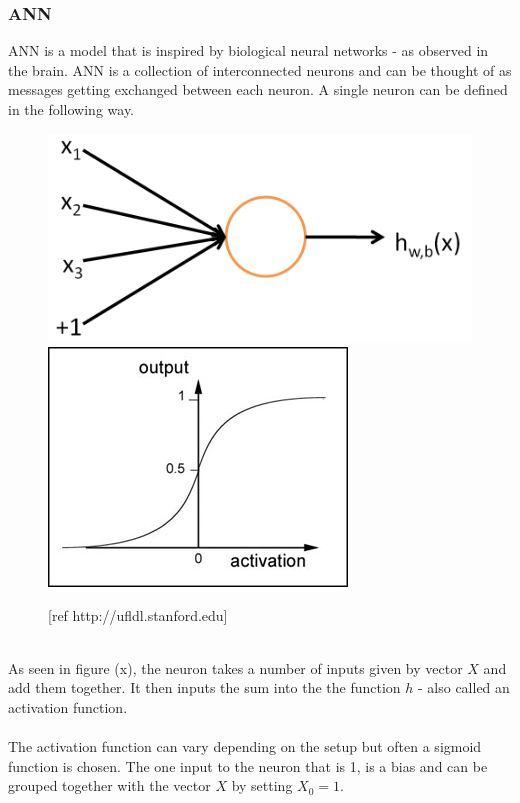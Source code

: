 \subsubsection{ANN}
ANN is a model that is inspired by biological neural networks - as observed in the brain. ANN is a collection of interconnected neurons and can be thought of as messages getting exchanged between each neuron. A single neuron can be defined in the following way.
\begin{figure}[!ht]
\centering
\includegraphics[scale=0.2]{SingleNeuron}
\includegraphics[scale=0.5]{sigmoid}
\caption{[ref http://ufldl.stanford.edu]}
\end{figure}
\\
As seen in figure (x), the neuron takes a number of inputs given by vector $ X $ and add them together. It then inputs the sum into the the function $ h $ - also called an activation function. %
\\
\\
The activation function can vary depending on the setup but often a sigmoid function is chosen. The one input to the neuron that is 1, is a bias and can be grouped together with the vector $ X $ by setting $ X_0 = 1 $.
\\
\\
